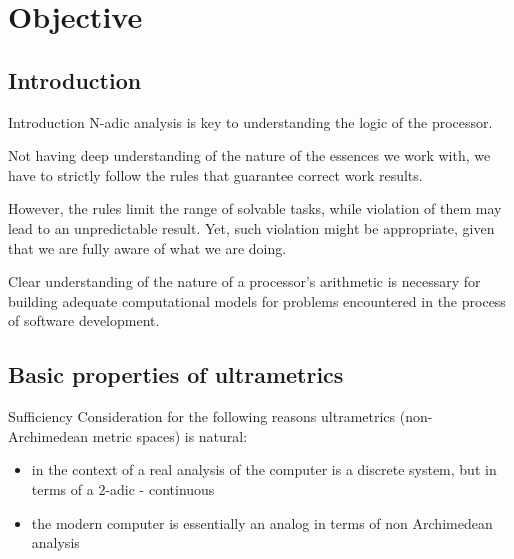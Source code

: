 

\section{Objective}

\subsection{Introduction}

\begin{frame}{Introduction}
N-adic analysis is key to understanding the logic of the processor.  
\pause

Not having deep understanding of the nature of the essences we work with, we have to strictly follow the rules that guarantee correct work results.
\pause

 However, the rules limit the range of solvable tasks, while violation of them may lead to an unpredictable result. Yet, such violation might be appropriate, given that we are fully aware of what we are doing.
\pause

Clear understanding of the nature of a processor's arithmetic is necessary for
building adequate computational models for problems encountered in the process of software development.
\end{frame}


\subsection{Basic properties of ultrametrics}

\begin{frame}{Sufficiency}
 Consideration for the following reasons ultrametrics (non-Archimedean metric spaces) is natural:
  \begin{itemize}
  \pause
  \item
in the context of a real analysis of the computer is a discrete system, but in terms of a 2-adic - continuous
     
  \pause
  \item
the modern computer is essentially an analog in terms of non Archimedean analysis
    
  \end{itemize}


\end{frame}

